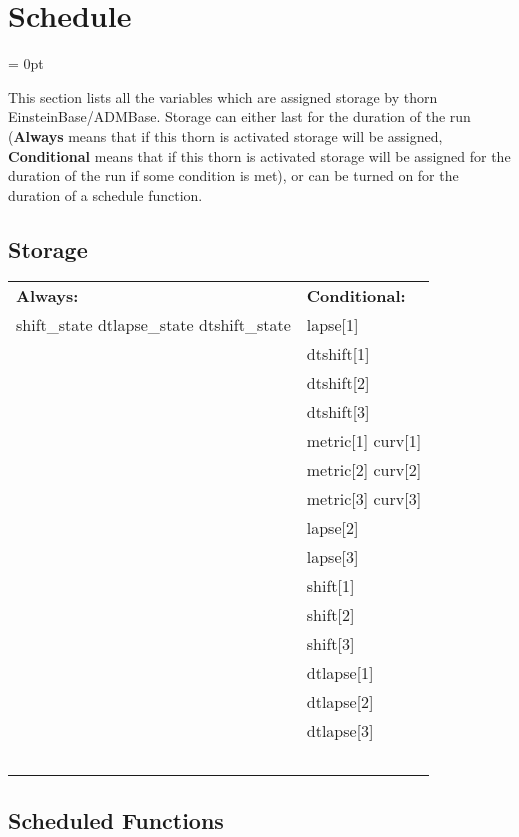 \documentclass{article}
\begin{document}
\section{Schedule} 


\parskip = 0pt


\noindent This section lists all the variables which are assigned storage by thorn EinsteinBase/ADMBase.  Storage can either last for the duration of the run ({\bf Always} means that if this thorn is activated storage will be assigned, {\bf Conditional} means that if this thorn is activated storage will be assigned for the duration of the run if some condition is met), or can be turned on for the duration of a schedule function.


\subsection*{Storage}

\hspace{5mm}

 \begin{tabular*}{160mm}{ll} 

{\bf Always:}& {\bf Conditional:} \\ 
 shift\_state dtlapse\_state dtshift\_state &  lapse[1]\\ 
~ &  dtshift[1]\\ 
~ &  dtshift[2]\\ 
~ &  dtshift[3]\\ 
~ &  metric[1] curv[1]\\ 
~ &  metric[2] curv[2]\\ 
~ &  metric[3] curv[3]\\ 
~ &  lapse[2]\\ 
~ &  lapse[3]\\ 
~ &  shift[1]\\ 
~ &  shift[2]\\ 
~ &  shift[3]\\ 
~ &  dtlapse[1]\\ 
~ &  dtlapse[2]\\ 
~ &  dtlapse[3]\\ 
~ & ~\\ 
\end{tabular*} 


\subsection*{Scheduled Functions}
\vspace{5mm}
\end{document}
